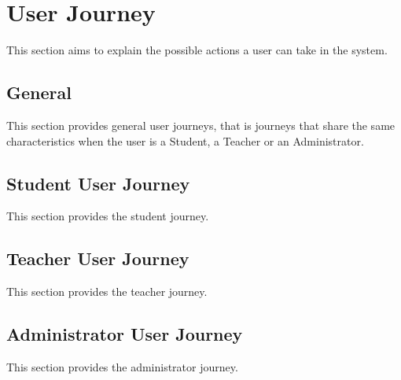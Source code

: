 \section{User Journey}
This section aims to explain the possible actions a user can take in the system. 

\subsection{General}
This section provides general user journeys, that is journeys that share the same 
characteristics when the user is a Student, a Teacher or an Administrator.
% 


% 

\subsection{Student User Journey}
This section provides the student journey.




\subsection{Teacher User Journey}
This section provides the teacher journey.





\subsection{Administrator User Journey}
This section provides the administrator journey.



